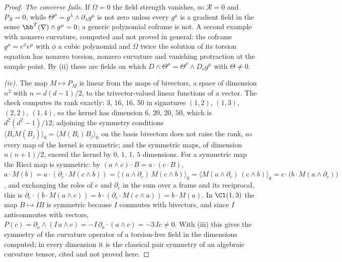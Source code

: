 \begin{proof}
\emph{The converse fails.} If $\Omega = 0$ the field strength vanishes, so $\mathcal{R} = 0$ and $P_{\mathcal{R}} = 0$, while $\Theta^{\mu} = g^{\lambda}\wedge\partial_{\lambda}g^{\mu}$ is not zero unless every $g^{\mu}$ is a gradient field in the sense $\hb^{T}(\nabla)\wedge g^{\mu} = 0$; a generic polynomial coframe is not. A second example with nonzero curvature, computed and not proved in general: the coframe $g^{\mu} = e^{\phi}e^{\mu}$ with $\phi$ a cubic polynomial and $\Omega$ twice the solution of its torsion equation has nonzero torsion, nonzero curvature and vanishing protraction at the sample point. By (ii) these are fields on which $D\wedge\Theta^{\mu} = \Theta^{\nu}\wedge D_{\nu}g^{\mu}$ with $\Theta \neq 0$.

\emph{(iv).} The map $M \mapsto P_{M}$ is linear from the maps of bivectors, a space of dimension $n^{2}$ with $n = d(d-1)/2$, to the trivector-valued linear functions of a vector. The check computes its rank exactly: $3$, $16$, $16$, $50$ in signatures $(1,2)$, $(1,3)$, $(2,2)$, $(1,4)$, so the kernel has dimension $6$, $20$, $20$, $50$, which is $d^{2}(d^{2}-1)/12$; adjoining the symmetry conditions $\langle B_{i}M(B_{j})\rangle_{0} = \langle M(B_{i})B_{j}\rangle_{0}$ on the basis bivectors does not raise the rank, so every map of the kernel is symmetric; and the symmetric maps, of dimension $n(n+1)/2$, exceed the kernel by $0$, $1$, $1$, $5$ dimensions. For a symmetric map the Ricci map is symmetric: by $(a\wedge c)\cdot B = a\cdot(c\cdot B)$, $a\cdot M(b) = a\cdot(\partial_{c}\cdot M(c\wedge b)) = \langle (a\wedge\partial_{c})\,M(c\wedge b)\rangle_{0} = \langle M(a\wedge\partial_{c})\,(c\wedge b)\rangle_{0} = c\cdot\bigl(b\cdot M(a\wedge\partial_{c})\bigr)$, and exchanging the roles of $c$ and $\partial_{c}$ in the sum over a frame and its reciprocal, this is $\partial_{c}\cdot(b\cdot M(a\wedge c)) = b\cdot(\partial_{c}\cdot M(c\wedge a)) = b\cdot M(a)$. In $\Cl(1,3)$ the map $B \mapsto I B$ is symmetric because $I$ commutes with bivectors, and since $I$ anticommutes with vectors, $P(c) = \partial_{a}\wedge(I\,a\wedge c) = -I\,\partial_{a}\cdot(a\wedge c) = -3\,I c \neq 0$. With (iii) this gives the symmetry of the curvature operator of a torsion-free field in the dimensions computed; in every dimension it is the classical pair symmetry of an algebraic curvature tensor, cited and not proved here.
\end{proof}
